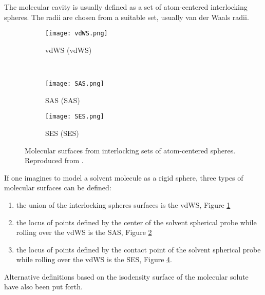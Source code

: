 The molecular cavity is usually defined as a set of atom-centered
interlocking spheres. The radii are chosen from a suitable set, usually
van der Waals radii.\autocite{Bondi1964-dt, Mantina2009-hb}

\begin{figure}[tb]
 \centering
 \begin{subfigure}{.45\textwidth}
   \centering
   \texttt{[image: vdWS.png]}
   \caption{\acrlong{vdWS} (\acrshort{vdWS})}
   \label{fig:vdWS}
 \end{subfigure}
 ~
 \begin{subfigure}{.45\textwidth}
   \centering
   \texttt{[image: SAS.png]}
   \caption{\acrlong{SAS} (\acrshort{SAS})}
   \label{fig:SAS}
 \end{subfigure}

 \begin{subfigure}{.45\textwidth}
   \centering
   \texttt{[image: SES.png]}
   \caption{\acrlong{SES} (\acrshort{SES})}
   \label{fig:SES}
 \end{subfigure}
 \caption{Molecular surfaces from interlocking sets of atom-centered spheres.
 Reproduced from .}
\end{figure}

If one imagines to model a solvent molecule as a rigid sphere,
three types of molecular surfaces can be defined:
\begin{enumerate}
  \item
    the union of the interlocking spheres surfaces is the \gls{vdWS},
    Figure \ref{fig:vdWS}
  \item the locus of points defined by the center of the solvent
    spherical probe while rolling over the \acrshort{vdWS} is the
    \gls{SAS}, Figure \ref{fig:SAS}
  \item the locus of points defined by the contact point of the solvent
    spherical probe while rolling over the \acrshort{vdWS} is the \gls{SES}, Figure \ref{fig:SES}.
\end{enumerate}
Alternative definitions based on the isodensity surface of the molecular solute
have also been put forth.\autocite{Foresman1996-wv}


